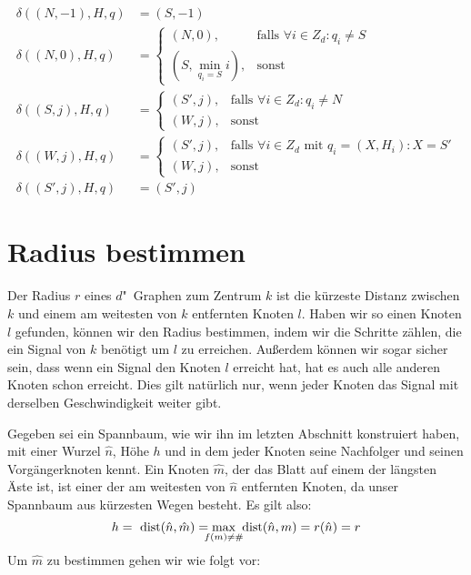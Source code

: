 \documentclass[11pt]{article}
\begin{document}
\begin{align*}
	\delta((N, -1), H, q) &= (S, -1) \\
	\delta((N, 0), H, q) &= \begin{cases}
							(N, 0), &\text{falls }\forall i \in Z_d : q_i \neq S \\
							(S, \min_{q_i = S} i), &\text{sonst}
						\end{cases} \\
	\delta((S, j), H, q) &= \begin{cases}
							(S', j), &\text{falls } \forall i \in Z_d : q_i \neq N \\
							(W, j),  & \text{sonst} 
						\end{cases} \\
	\delta((W, j), H, q) &= \begin{cases}
							(S', j), & \text{falls }\forall i \in Z_d \text{ mit } q_i = (X, H_i) : X = S' \\
							(W, j),  & \text{sonst} 
						\end{cases} \\
	\delta((S', j), H, q) &= (S', j)
\end{align*}

\section{Radius bestimmen}
Der Radius $r$ eines $d$"~Graphen zum Zentrum $k$ ist die kürzeste Distanz zwischen $k$ und einem am weitesten von $k$ entfernten Knoten $l$. 
Haben wir so einen Knoten $l$ gefunden, können wir den Radius bestimmen, indem wir die Schritte zählen, die ein Signal von $k$ benötigt um $l$ zu erreichen. 
Außerdem können wir sogar sicher sein, dass wenn ein Signal den Knoten $l$ erreicht hat, hat es auch alle anderen Knoten schon erreicht. 
Dies gilt natürlich nur, wenn jeder Knoten das Signal mit derselben Geschwindigkeit weiter gibt.

Gegeben sei ein Spannbaum, wie wir ihn im letzten Abschnitt konstruiert haben, mit einer Wurzel $\hat{n}$, Höhe $h$ und in dem jeder Knoten seine Nachfolger und seinen Vorgängerknoten kennt. 
Ein Knoten $\hat{m}$, der das Blatt auf einem der längsten Äste ist, ist einer der am weitesten von $\hat{n}$ entfernten Knoten, da unser Spannbaum aus kürzesten Wegen besteht. 
Es gilt also:
\begin{displaymath}
h = \text{ dist}(\hat{n}, \hat{m}) =  \max_{\mathclap{f(m) \neq \#}} \text{ dist}(\hat{n}, m) = r(\hat{n}) = r
\end{displaymath}
Um $\hat{m}$ zu bestimmen gehen wir wie folgt vor:
\end{document}
